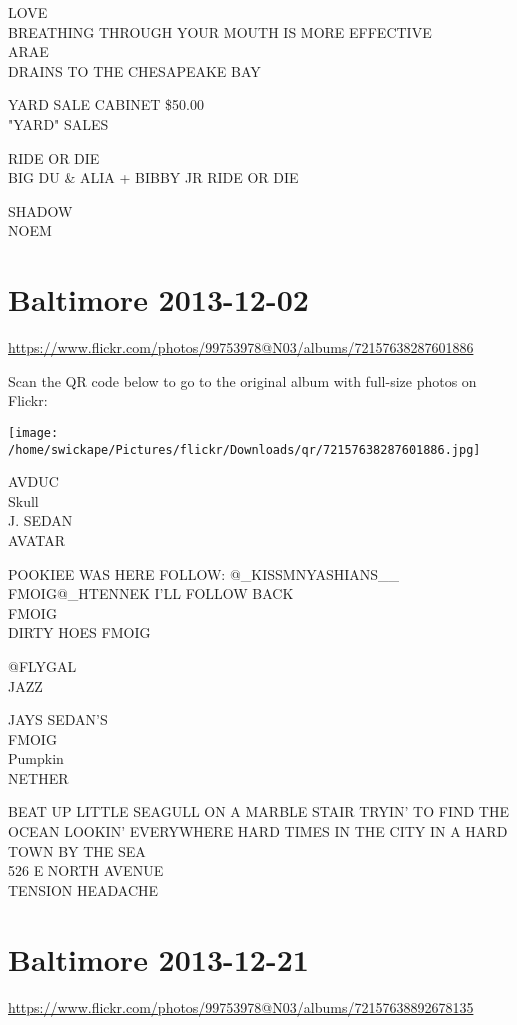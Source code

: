 \documentclass[10pt,letterpaper]{article}
\begin{document}
LOVE\\
BREATHING THROUGH YOUR MOUTH IS MORE EFFECTIVE\\
ARAE\\
DRAINS TO THE CHESAPEAKE BAY

YARD SALE CABINET \$50.00\\
"YARD" SALES

RIDE OR DIE\\
BIG DU \& ALIA + BIBBY JR RIDE OR DIE

SHADOW\\
NOEM


\section*{Baltimore 2013-12-02}

\url{https://www.flickr.com/photos/99753978@N03/albums/72157638287601886}

Scan the QR code below to go to the original album with full-size photos on Flickr:

\texttt{[image: /home/swickape/Pictures/flickr/Downloads/qr/72157638287601886.jpg]}


AVDUC\\
Skull\\
J. SEDAN\\
AVATAR

POOKIEE WAS HERE FOLLOW: @\_KISSMNYASHIANS\_\_\\
FMOIG@\_HTENNEK I'LL FOLLOW BACK\\
FMOIG\\
DIRTY HOES FMOIG

@FLYGAL\\
JAZZ

JAYS SEDAN'S\\
FMOIG\\
Pumpkin\\
NETHER

BEAT UP LITTLE SEAGULL ON A MARBLE STAIR TRYIN' TO FIND THE OCEAN LOOKIN' EVERYWHERE HARD TIMES IN THE CITY IN A HARD TOWN BY THE SEA\\
526 E NORTH AVENUE\\
TENSION HEADACHE


\section*{Baltimore 2013-12-21}

\url{https://www.flickr.com/photos/99753978@N03/albums/72157638892678135}
\end{document}
